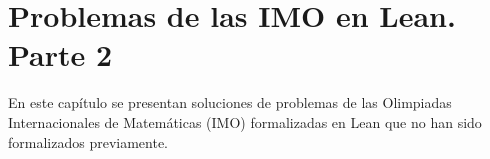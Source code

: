\chapter{Problemas de las IMO en Lean. Parte 2}

En este capítulo se presentan soluciones de problemas de las Olimpiadas
Internacionales de Matemáticas (IMO) formalizadas en Lean que no han sido
formalizados previamente.